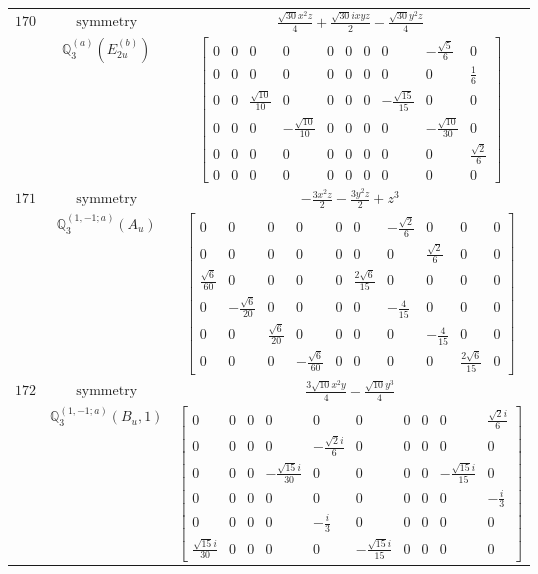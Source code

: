 \documentclass[fleqn,8pt,landscape]{jsarticle}
\begin{document}
\begin{longtable}{ccc}
$ 170 $ & $ \text{symmetry} $ & $ \frac{\sqrt{30} x^{2} z}{4} + \frac{\sqrt{30} i x y z}{2} - \frac{\sqrt{30} y^{2} z}{4} $ \\
$  $ & $ \mathbb{Q}_{3}^{(a)}(E_{2u}^{(b)}) $ & $ \begin{bmatrix} 0 & 0 & 0 & 0 & 0 & 0 & 0 & 0 & - \frac{\sqrt{5}}{6} & 0 \\ 0 & 0 & 0 & 0 & 0 & 0 & 0 & 0 & 0 & \frac{1}{6} \\ 0 & 0 & \frac{\sqrt{10}}{10} & 0 & 0 & 0 & 0 & - \frac{\sqrt{15}}{15} & 0 & 0 \\ 0 & 0 & 0 & - \frac{\sqrt{10}}{10} & 0 & 0 & 0 & 0 & - \frac{\sqrt{10}}{30} & 0 \\ 0 & 0 & 0 & 0 & 0 & 0 & 0 & 0 & 0 & \frac{\sqrt{2}}{6} \\ 0 & 0 & 0 & 0 & 0 & 0 & 0 & 0 & 0 & 0 \end{bmatrix} $ \\ \hline
$ 171 $ & $ \text{symmetry} $ & $ - \frac{3 x^{2} z}{2} - \frac{3 y^{2} z}{2} + z^{3} $ \\
$  $ & $ \mathbb{Q}_{3}^{(1,-1;a)}(A_{u}) $ & $ \begin{bmatrix} 0 & 0 & 0 & 0 & 0 & 0 & - \frac{\sqrt{2}}{6} & 0 & 0 & 0 \\ 0 & 0 & 0 & 0 & 0 & 0 & 0 & \frac{\sqrt{2}}{6} & 0 & 0 \\ \frac{\sqrt{6}}{60} & 0 & 0 & 0 & 0 & \frac{2 \sqrt{6}}{15} & 0 & 0 & 0 & 0 \\ 0 & - \frac{\sqrt{6}}{20} & 0 & 0 & 0 & 0 & - \frac{4}{15} & 0 & 0 & 0 \\ 0 & 0 & \frac{\sqrt{6}}{20} & 0 & 0 & 0 & 0 & - \frac{4}{15} & 0 & 0 \\ 0 & 0 & 0 & - \frac{\sqrt{6}}{60} & 0 & 0 & 0 & 0 & \frac{2 \sqrt{6}}{15} & 0 \end{bmatrix} $ \\ \hline
$ 172 $ & $ \text{symmetry} $ & $ \frac{3 \sqrt{10} x^{2} y}{4} - \frac{\sqrt{10} y^{3}}{4} $ \\
$  $ & $ \mathbb{Q}_{3}^{(1,-1;a)}(B_{u},1) $ & $ \begin{bmatrix} 0 & 0 & 0 & 0 & 0 & 0 & 0 & 0 & 0 & \frac{\sqrt{2} i}{6} \\ 0 & 0 & 0 & 0 & - \frac{\sqrt{2} i}{6} & 0 & 0 & 0 & 0 & 0 \\ 0 & 0 & 0 & - \frac{\sqrt{15} i}{30} & 0 & 0 & 0 & 0 & - \frac{\sqrt{15} i}{15} & 0 \\ 0 & 0 & 0 & 0 & 0 & 0 & 0 & 0 & 0 & - \frac{i}{3} \\ 0 & 0 & 0 & 0 & - \frac{i}{3} & 0 & 0 & 0 & 0 & 0 \\ \frac{\sqrt{15} i}{30} & 0 & 0 & 0 & 0 & - \frac{\sqrt{15} i}{15} & 0 & 0 & 0 & 0 \end{bmatrix} $ \\ \hline

\end{longtable}
\end{document}
